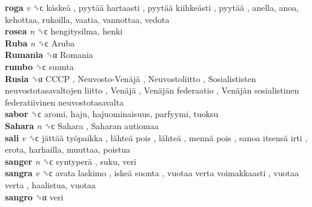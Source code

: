 \textbf{roga} \emph{v}  ␝ϲ   käskeä ,  pyytää hartaasti ,  pyytää kiihkeästi ,  pyytää , anella, anoa, kehottaa, rukoilla, vaatia, vannottaa, vedota  \\
\textbf{rosea} \emph{n}  ␝ϲ  hengitysilma, henki  \\
\textbf{Ruba} \emph{n}  ␝ϲ   Aruba   \\
\textbf{Rumania} ␝α   Romania   \\
\textbf{rumbo} ␝ϲ  suunta  \\
\textbf{Rusia} ␝α   CCCP ,  Neuvosto-Venäjä ,  Neuvostoliitto ,  Sosialististen neuvostotasavaltojen liitto ,  Venäjä ,  Venäjän federaatio ,  Venäjän sosialistinen federatiivinen neuvostotasavalta   \\
\textbf{sabor} ␝ϲ  aromi, haju, hajuominaisuus, parfyymi, tuoksu  \\
\textbf{Sahara} \emph{n}  ␝ϲ   Sahara ,  Saharan autiomaa   \\
\textbf{sali} \emph{v}  ␝ϲ   jättää työpaikka ,  lähteä pois ,  lähteä ,  mennä pois ,  sanoa itsensä irti , erota, harhailla, muuttaa, poistua  \\
\textbf{sanger} \emph{n}  ␝ϲ   syntyperä , suku, veri  \\
\textbf{sangra} \emph{v}  ␝ϲ   avata laskimo ,  iskeä suonta ,  vuotaa verta voimakkaasti ,  vuotaa verta , haalistua, vuotaa  \\
\textbf{sangro} ␝α  veri  \\
